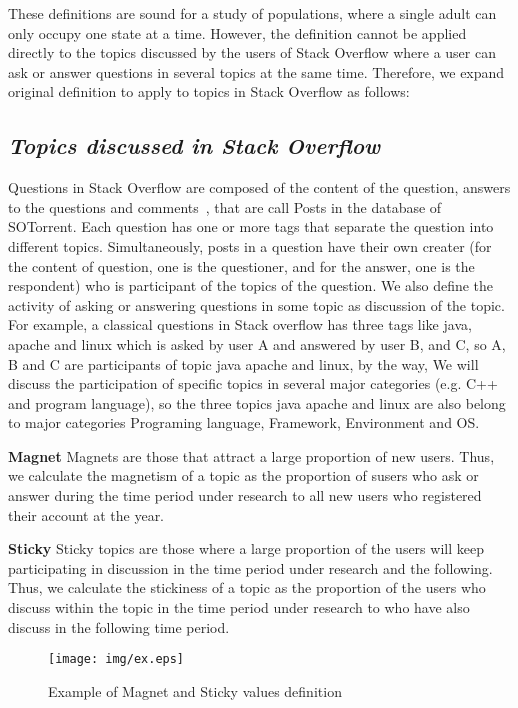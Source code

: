 \documentclass[conference]{IEEEtran}
\begin{document}
These definitions are sound for a study of populations, where a single adult can only occupy one state at a time. However, the definition cannot be applied directly to the topics discussed by the users of Stack Overflow where a user can ask or answer questions in several topics at the same time. Therefore, we expand original definition to apply to topics in Stack Overflow as follows:

\smallskip
\subsection*{\textit{\textbf{Topics discussed in Stack Overflow}}}

Questions in Stack Overflow are composed of the content of the question, answers to the questions and comments~\cite{liu2018mining}, that are call Posts in the database of SOTorrent. Each question has one or more tags that separate the question into different topics. Simultaneously, posts in a question have their own creater (for the content of question, one is the questioner, and for the answer, one is the respondent) who is participant of the topics of the question. We also define the activity of asking or answering questions in some topic as discussion of the topic. For example, a classical questions in Stack overflow has three tags like java, apache and linux which is asked by user A and answered by user B, and C, so A, B and C are participants of topic java apache and linux, by the way, We will discuss the participation of specific topics in several major categories (e.g. C++ and program language), so the three topics java apache and linux are also belong to major categories Programing language, Framework, Environment and OS.
\smallskip

\textbf{Magnet}
Magnets are those that attract a large proportion of new users. Thus, we calculate the magnetism of a topic as the proportion of susers who ask or answer during the time period under research to all new users who registered their account at the year.
\smallskip
\smallskip

\textbf{Sticky}
Sticky topics are those where a large proportion of the users will keep participating in discussion in the time period under research and the following. Thus, we calculate the stickiness of a topic as the proportion of the users who discuss within the topic in the time period under research to who have also discuss in the following time period.

\begin{figure}[t]
 \centering
 \texttt{[image: img/ex.eps]}  
 \caption{Example of Magnet and Sticky values definition} 
 \label{fig:example2} 
\end{figure}
\smallskip
\smallskip
\end{document}
